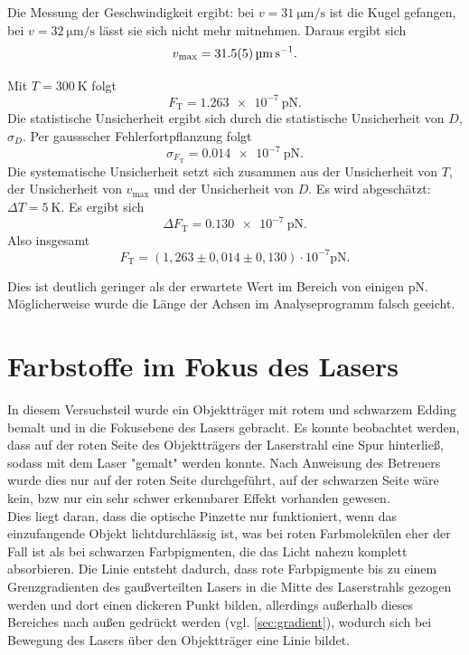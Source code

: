Die Messung der Geschwindigkeit ergibt: bei $v=\SI{31}{\micro\meter\per\second}$ ist die Kugel gefangen, bei $v=\SI{32}{\micro\meter\per\second}$ lässt sie sich nicht mehr mitnehmen. Daraus ergibt sich
\begin{equation}
 v_{\textrm{max}} = \SI{31,5\pm0,5}{\micro\meter\per\second}.
\end{equation}

Mit $T=\SI{300}{\kelvin}$ folgt
\begin{equation}
 F_{\textrm{T}} =  \SI{1,263e-7}{\pico\newton}.
\end{equation}
Die statistische Unsicherheit ergibt sich durch die statistische Unsicherheit von $D$, $\sigma_{D}$. Per gaussscher Fehlerfortpflanzung folgt
\begin{equation}
 \sigma_{F_{\textrm{T}}} = \SI{0,014e-7}{\pico\newton}.
\end{equation}
Die systematische Unsicherheit setzt sich zusammen aus der Unsicherheit von $T$, der Unsicherheit von $v_{\textrm{max}}$ und der Unsicherheit von $D$. Es wird abgeschätzt: $\Delta T = \SI{5}{\kelvin}$.
Es ergibt sich
\begin{equation}
 \Delta F_{\textrm{T}} = \SI{0,130e-7}{\pico\newton}.
\end{equation}
Also insgesamt
\begin{equation}
 F_{\textrm{T}} = (1,263\pm0,014\pm0,130)\cdot 10^{-7} \si{\pico\newton}.
\end{equation}

Dies ist deutlich geringer als der erwartete Wert im Bereich von einigen $\si{\pico\newton}$. Möglicherweise wurde die Länge der Achsen im Analyseprogramm falsch geeicht.

\section{Farbstoffe im Fokus des Lasers}

In diesem Versuchsteil wurde ein Objektträger mit rotem und schwarzem Edding bemalt und in die Fokusebene des Lasers gebracht. 
Es konnte beobachtet werden, dass auf der roten Seite des Objektträgers der Laserstrahl eine Spur hinterließ, sodass mit dem Laser "gemalt" werden konnte. Nach Anweisung des Betreuers wurde dies nur auf der roten Seite durchgeführt, auf der schwarzen Seite wäre kein, bzw nur ein sehr schwer erkennbarer Effekt vorhanden gewesen.\\
Dies liegt daran, dass die optische Pinzette nur funktioniert, wenn das einzufangende Objekt lichtdurchlässig ist, was bei roten Farbmolekülen eher der Fall ist als bei schwarzen Farbpigmenten, die das Licht nahezu komplett absorbieren.
Die Linie entsteht dadurch, dass rote Farbpigmente bis zu einem Grenzgradienten des gaußverteilten Lasers in die Mitte des Laserstrahls gezogen werden und dort einen dickeren Punkt bilden, allerdings außerhalb dieses Bereiches nach außen gedrückt werden (vgl. \ref{sec:gradient}), wodurch sich bei Bewegung des Lasers über den Objektträger eine Linie bildet.
